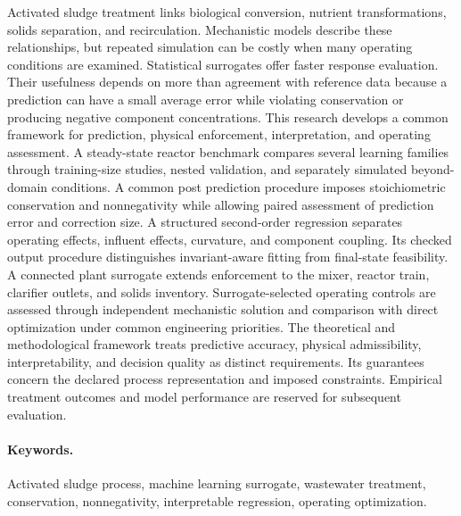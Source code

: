 \documentclass[12pt,twoside]{book}
\begin{document}
Activated sludge treatment links biological conversion, nutrient transformations, solids separation, and recirculation. Mechanistic models describe these relationships, but repeated simulation can be costly when many operating conditions are examined. Statistical surrogates offer faster response evaluation. Their usefulness depends on more than agreement with reference data because a prediction can have a small average error while violating conservation or producing negative component concentrations. This research develops a common framework for prediction, physical enforcement, interpretation, and operating assessment. A steady-state reactor benchmark compares several learning families through training-size studies, nested validation, and separately simulated beyond-domain conditions. A common post prediction procedure imposes stoichiometric conservation and nonnegativity while allowing paired assessment of prediction error and correction size. A structured second-order regression separates operating effects, influent effects, curvature, and component coupling. Its checked output procedure distinguishes invariant-aware fitting from final-state feasibility. A connected plant surrogate extends enforcement to the mixer, reactor train, clarifier outlets, and solids inventory. Surrogate-selected operating controls are assessed through independent mechanistic solution and comparison with direct optimization under common engineering priorities. The theoretical and methodological framework treats predictive accuracy, physical admissibility, interpretability, and decision quality as distinct requirements. Its guarantees concern the declared process representation and imposed constraints. Empirical treatment outcomes and model performance are reserved for subsequent evaluation.

\paragraph*{Keywords.} Activated sludge process, machine learning surrogate, wastewater treatment, conservation, nonnegativity, interpretable regression, operating optimization.

\cleardoublepage
\tableofcontents
\cleardoublepage
\listoffigures
\cleardoublepage
\listoftables

\cleardoublepage
\end{document}
